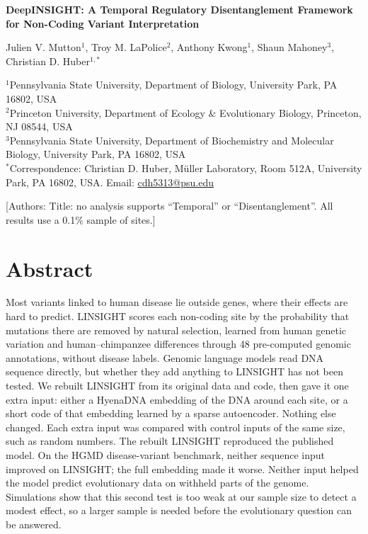 \documentclass[11pt]{article}
\newcommand{\authornote}[1]{{\color{red!70!black}\small [Authors: #1]}}
\begin{document}
\begin{center}
{\LARGE\bfseries DeepINSIGHT: A Temporal Regulatory Disentanglement Framework\\[2pt] for Non-Coding Variant Interpretation\par}
\vspace{8pt}
{\large Julien V. Mutton$^{1}$, Troy M. LaPolice$^{2}$, Anthony Kwong$^{1}$, Shaun Mahoney$^{3}$, Christian D. Huber$^{1,*}$\par}
\vspace{5pt}
{\small
$^{1}$Pennsylvania State University, Department of Biology, University Park, PA 16802, USA\\
$^{2}$Princeton University, Department of Ecology \& Evolutionary Biology, Princeton, NJ 08544, USA\\
$^{3}$Pennsylvania State University, Department of Biochemistry and Molecular Biology, University Park, PA 16802, USA\\[3pt]
$^{*}$Correspondence: Christian D. Huber, M\"uller Laboratory, Room 512A, University Park, PA 16802, USA.
Email: \href{mailto:cdh5313@psu.edu}{cdh5313@psu.edu}\par}
\end{center}

\authornote{Title: no analysis supports ``Temporal'' or ``Disentanglement''. All results use a 0.1\% sample of sites.}

\section*{Abstract}
Most variants linked to human disease lie outside genes, where their effects are hard to predict.
LINSIGHT scores each non-coding site by the probability that mutations there are removed by natural
selection, learned from human genetic variation and human--chimpanzee differences through 48
pre-computed genomic annotations, without disease labels. Genomic language models read DNA sequence
directly, but whether they add anything to LINSIGHT has not been tested. We rebuilt LINSIGHT from its
original data and code, then gave it one extra input: either a HyenaDNA embedding of the DNA around
each site, or a short code of that embedding learned by a sparse autoencoder. Nothing else changed.
Each extra input was compared with control inputs of the same size, such as random numbers. The
rebuilt LINSIGHT reproduced the published model. On the HGMD disease-variant benchmark, neither
sequence input improved on LINSIGHT; the full embedding made it worse. Neither input helped the model
predict evolutionary data on withheld parts of the genome. Simulations show that this second test is
too weak at our sample size to detect a modest effect, so a larger sample is needed before the
evolutionary question can be answered.
\end{document}
